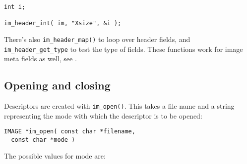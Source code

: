 \begin{verbatim}
int i;

im_header_int( im, "Xsize", &i );
\end{verbatim}

There's also \verb+im_header_map()+ to loop over header fields, and
\verb+im_header_get_type+ to test the type of fields. These functions work for
image meta fields as well, see .

\subsection{Opening and closing}

Descriptors are created with \verb+im_open()+. This takes a file name
and a string representing the mode with which the descriptor is to be opened:

\begin{verbatim}
IMAGE *im_open( const char *filename, 
  const char *mode )
\end{verbatim}

The possible values for mode are:
  
